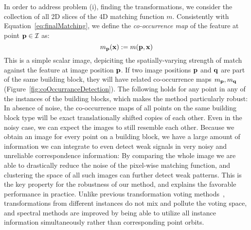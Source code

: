 \documentclass{acmtog}
\begin{document}
In order to address problem (i), finding the transformations, we consider the collection of all 2D slices of the 4D matching function $m$. Consistently with Equation~\ref{eq:finalMatching}, we define the \emph{co-occurrence map} of the feature at point $\mathbf{p} \in \mathcal{I}$ as:
%
\begin{equation}
m_{\mathbf{p}}(\mathbf{x}) := m(\mathbf{p}, \mathbf{x})
\label{eq:corr-map}
\end{equation}
%
This is a simple scalar image, depiciting the spatially-varying strength of match against the feature at image position $\mathbf{p}$. If two image positions $\mathbf{p}$ and $\mathbf{q}$ are part of the same building block, they will have related co-occurrence maps $m_{\mathbf{p}},m_{\mathbf{q}}$ (Figure~\ref{fig:coOccurranceDetection}). The following holds for any point in any of the instances of the building blocks, which makes the method particularly robust:
In absence of noise, the co-occurrence maps of all points on the same building block type will be exact translationally shifted copies of each other. Even in the noisy case, we can expect the images to still resemble each other. Because we obtain an image for every point on a building block, we have a large amount of information we can integrate to even detect weak signals in very noisy and unreliable correspondence information: By comparing the whole image we are able to drastically reduce the noise of the pixel-wise matching function, and clustering the space of all such images can further detect weak patterns. This is the key property for the robustness of our method, and explains the favorable performance in practice. Unlike previous transformation voting methods~\cite{Mitra2006PAA}, transformations from different instances do not mix and pollute the voting space, and spectral methods are improved by being able to utilize all instance information simultaneously rather than corresponding point orbits.
\end{document}

